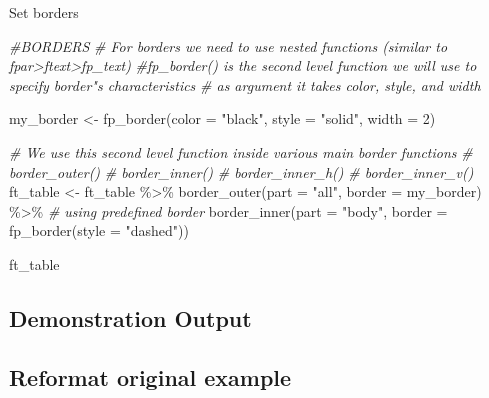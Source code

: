 \documentclass[
]{book}
\newenvironment{Shaded}{\begin{snugshade}}{\end{snugshade}}
\newcommand{\AttributeTok}[1]{\textcolor[rgb]{0.77,0.63,0.00}{#1}}
\newcommand{\CommentTok}[1]{\textcolor[rgb]{0.56,0.35,0.01}{\textit{#1}}}
\newcommand{\DecValTok}[1]{\textcolor[rgb]{0.00,0.00,0.81}{#1}}
\newcommand{\FunctionTok}[1]{\textcolor[rgb]{0.00,0.00,0.00}{#1}}
\newcommand{\NormalTok}[1]{#1}
\newcommand{\OtherTok}[1]{\textcolor[rgb]{0.56,0.35,0.01}{#1}}
\newcommand{\SpecialCharTok}[1]{\textcolor[rgb]{0.00,0.00,0.00}{#1}}
\newcommand{\StringTok}[1]{\textcolor[rgb]{0.31,0.60,0.02}{#1}}
\begin{document}
Set borders

\begin{Shaded}
\begin{Highlighting}[]
\CommentTok{\#BORDERS}
\CommentTok{\# For borders we need to use nested functions (similar to fpar\textgreater{}ftext\textgreater{}fp\_text)}
\CommentTok{\#fp\_border() is the second level function we will use to specify border"s characteristics}
\CommentTok{\# as argument it takes color, style, and width}
  
\NormalTok{my\_border }\OtherTok{\textless{}{-}} \FunctionTok{fp\_border}\NormalTok{(}\AttributeTok{color =} \StringTok{"black"}\NormalTok{, }\AttributeTok{style =} \StringTok{"solid"}\NormalTok{, }\AttributeTok{width =} \DecValTok{2}\NormalTok{)}

\CommentTok{\# We use this second level function inside various main border functions}
\CommentTok{\# border\_outer()}
\CommentTok{\# border\_inner()}
\CommentTok{\# border\_inner\_h()}
\CommentTok{\# border\_inner\_v()}
\NormalTok{ft\_table }\OtherTok{\textless{}{-}}\NormalTok{ ft\_table }\SpecialCharTok{\%\textgreater{}\%}
  \FunctionTok{border\_outer}\NormalTok{(}\AttributeTok{part =} \StringTok{"all"}\NormalTok{, }\AttributeTok{border =}\NormalTok{ my\_border) }\SpecialCharTok{\%\textgreater{}\%} \CommentTok{\# using predefined border}
  \FunctionTok{border\_inner}\NormalTok{(}\AttributeTok{part =} \StringTok{"body"}\NormalTok{, }\AttributeTok{border =} \FunctionTok{fp\_border}\NormalTok{(}\AttributeTok{style =} \StringTok{"dashed"}\NormalTok{))}

\NormalTok{ft\_table}
\end{Highlighting}
\end{Shaded}

\hypertarget{demonstration-output}{%
\subsection{Demonstration Output}\label{demonstration-output}}

\hypertarget{reformat-original-example}{%
\subsection{Reformat original example}\label{reformat-original-example}}
\end{document}
